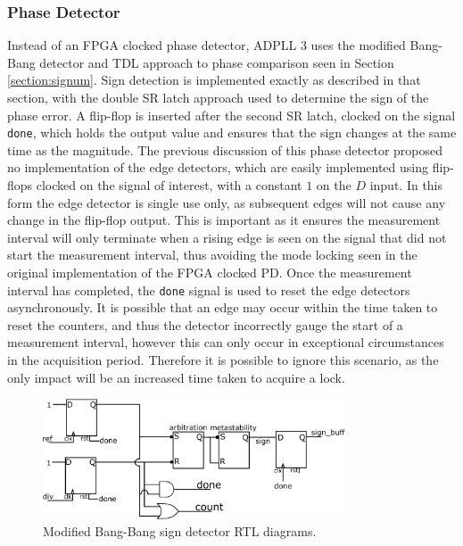 \subsubsection{Phase Detector}
Instead of an \ac{FPGA} clocked phase detector, \ac{ADPLL} 3 uses the modified Bang-Bang detector and \ac{TDL} approach to phase comparison seen in Section \ref{section:signum}. Sign detection is implemented exactly as described in that section, with the double \ac{SR} latch approach used to determine the sign of the phase error. A flip-flop is inserted after the second \ac{SR} latch, clocked on the signal \texttt{done}, which holds the output value and ensures that the sign changes at the same time as the magnitude. The previous discussion of this phase detector proposed no implementation of the edge detectors, which are easily implemented using flip-flops clocked on the signal of interest, with a constant $1$ on the $D$ input. In this form the edge detector is single use only, as subsequent edges will not cause any change in the flip-flop output. This is important as it ensures the measurement interval will only terminate when a rising edge is seen on the signal that did not start the measurement interval, thus avoiding the mode locking seen in the original implementation of the \ac{FPGA} clocked \ac{PD}. Once the measurement interval has completed, the \texttt{done} signal is used to reset the edge detectors asynchronously. It is possible that an edge may occur within the time taken to reset the counters, and thus the detector incorrectly gauge the start of a measurement interval, however this can only occur in exceptional circumstances in the acquisition period. Therefore it is possible to ignore this scenario, as the only impact will be an increased time taken to acquire a lock.
\begin{figure}[h]
    \centering
    \includegraphics[width=0.8\textwidth]{../new_pdet1}
    \caption[Modified Bang-Bang sign detector RTL diagrams]{Modified Bang-Bang sign detector RTL diagrams.}
    \label{fig:signdet_impl}
\end{figure}

